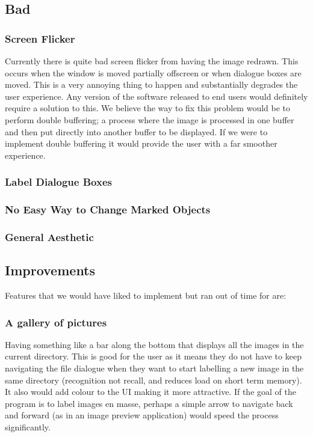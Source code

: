 \documentclass[a4paper,11pt,oneside]{article}
\begin{document}
\subsection{Bad}
\subsubsection{Screen Flicker}
Currently there is quite bad screen flicker from having the image redrawn.  This
occurs when the window is moved partially offscreen or when dialogue boxes are
moved.  This is a very annoying thing to happen and substantially degrades the
user experience. Any version of the software released to end users would
definitely require a solution to this.  We believe the way to fix this problem
would be to perform double buffering; a process where the image is processed in
one buffer and then put directly into another buffer to be displayed.  If we
were to implement double buffering it would provide the user with a far smoother
experience.
\subsubsection{Label Dialogue Boxes}
\subsubsection{No Easy Way to Change Marked Objects}
\subsubsection{General Aesthetic}

\subsection{Improvements}
Features that we would have liked to implement but ran out of time for are:
\subsubsection{A gallery of pictures} 
Having something like a bar along the bottom that displays all the images in the
current directory.  This is good for the user as it means they do not have to
keep navigating the file dialogue when they want to start labelling a new image
in the same directory (recognition not recall, and reduces load on short term
memory).  It also would add colour to the UI making it more attractive. If the
goal of the program is to label images en masse, perhaps a simple arrow to
navigate back and forward (as in an image preview application) would speed the
process significantly.
\end{document}
